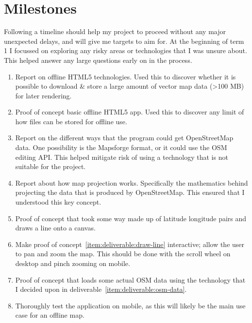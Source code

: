 \documentclass[]{final_report}
\begin{document}
\section{Milestones}


Following a timeline should help my project to proceed without any major unexpected delays, and will give me targets to aim for. At the beginning of term 1 I focussed on exploring any risky areas or technologies that I was unsure about. This helped answer any large questions early on in the process.

\begin{enumerate}
    \item Report on offline HTML5 technologies. Used this to discover whether it is possible to download \& store a large amount of vector map data (>100 MB) for later rendering.\label{item:deliverable:offline-html}
    \item Proof of concept basic offline HTML5 app. Used this to discover any limit of how files can be stored for offline use.\label{item:deliverable:basic-offline-app}
    \item Report on the different ways  that the program could get OpenStreetMap data. One possibility is the Mapsforge format, or it could use the OSM editing API\@. This helped mitigate risk of using a technology that is not suitable for the project.\label{item:deliverable:osm-data}
    \item Report about how map projection works. Specifically the mathematics behind projecting the data that is produced by OpenStreetMap. This ensured that I understood this key concept.\label{item:deliverable:map-projection}
    \item Proof of concept that took some way made up of latitude longitude pairs and draws a line onto a canvas.\label{item:deliverable:draw-line}
    \item Make proof of concept~\ref{item:deliverable:draw-line} interactive; allow the user to pan and zoom the map. This should be done with the scroll wheel on desktop and pinch zooming on mobile.\label{item:deliverable:pan-zoom}
    \item Proof of concept that loads some actual OSM data using the technology that I decided upon in deliverable~\ref{item:deliverable:osm-data}.\label{item:deliverable:load-osm-data}
    \item Thoroughly test the application on mobile, as this will likely be the main use case for an offline map.\label{item:deliverable:mobile-testing}

\end{enumerate}
\end{document}
